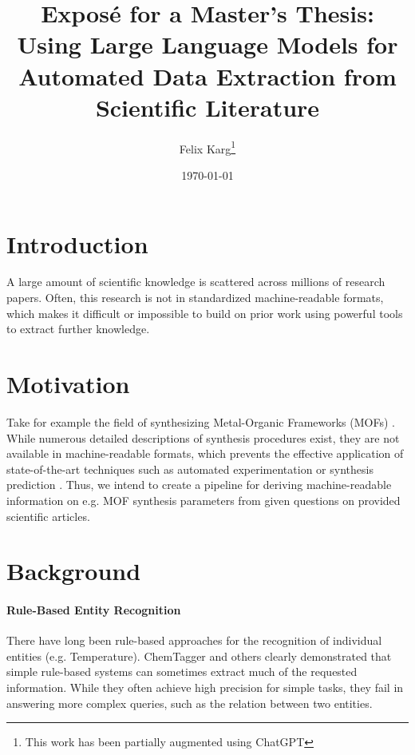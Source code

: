 \documentclass[a4paper,11pt]{article}
\title{Exposé for a Master's Thesis: Using Large Language Models for Automated Data Extraction from Scientific Literature}
\author{Felix Karg\footnote{This work has been partially augmented using ChatGPT}}
\date{\today}
\newcommand{\margtodo}                                 %
{\marginpar{\textbf{\textcolor{red}{ToDo}}}{}}
\newcommand{\todo}[1]
{{\textbf{\textcolor{red}{[\margtodo{}#1]}}}{}}   %
\begin{document}
\maketitle




\section{Introduction}
A large amount of scientific knowledge is scattered across millions of research
papers. Often, this research is not in standardized machine-readable formats,
which makes it difficult or impossible to build on prior work using powerful
tools to extract further knowledge.  %

\section{Motivation}
Take for example the field of synthesizing Metal-Organic Frameworks (MOFs)
\cite{zhou_introduction_2012}. While numerous detailed descriptions of
synthesis procedures exist, they are not available in machine-readable formats,
which prevents the effective application of state-of-the-art techniques such as
automated experimentation \cite{shi_automated_2021} or synthesis prediction
\cite{luo_mof_2022}. Thus, we intend to create a pipeline for deriving
machine-readable information on e.g. MOF synthesis parameters from given questions
on provided scientific articles.


\section{Background}
\paragraph{Rule-Based Entity Recognition}
There have long been rule-based approaches for the recognition of individual
entities (e.g. Temperature). ChemTagger \cite{hawizy_chemicaltagger_2011}
and others \cite{beard_comparative_2019, huang_database_2020}
clearly demonstrated that simple rule-based systems can sometimes extract much
of the requested information. While they often achieve high precision for
simple tasks, they fail in answering more complex queries, such as the relation
between two entities.
\end{document}
